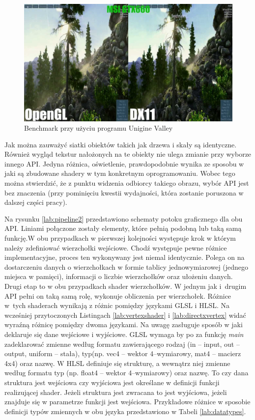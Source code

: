 \documentclass[archive]{mgr}
\begin{document}
\begin{figure}[h!]
  \centering
    \includegraphics[width=1\textwidth]{images/valley.jpg}
   \caption{Benchmark przy użyciu programu Unigine Valley}
   \label{lab:valley}
\end{figure}

Jak można zauważyć siatki obiektów takich jak drzewa i skały są identyczne. Również wygląd tekstur nałożonych na te obiekty nie ulega zmianie przy wyborze innego API. Jedyna różnica, oświetlenie, prawdopodobnie wynika ze sposobu w jaki są zbudowane shadery w tym konkretnym oprogramowaniu. Wobec tego można stwierdzić, że z punktu widzenia odbiorcy takiego obrazu, wybór API jest bez znaczenia (przy pominięciu kwestii wydajności, która zostanie poruszona w dalszej części pracy).

\newpage
Na rysunku \ref{lab:pipeline2} przedstawiono schematy potoku graficznego dla obu API. Liniami połączone zostały elementy, które pełnią podobną lub taką samą funkcję.W obu przypadkach w pierwszej kolejności występuje krok w którym należy zdefiniować wierzchołki wejściowe. Chodź występuje pewne różnice implementacyjne, proces ten wykonywany jest niemal identycznie. Polega on na dostarczeniu danych o wierzchołkach w formie tablicy jednowymiarowej (jednego miejsca w pamięci), informacji o liczbie wierzchołków oraz ułożeniu danych. Drugi etap to w obu przypadkach shader wierzchołków. W jednym jak i~drugim API pełni on taką samą rolę, wykonuje obliczenia per wierzchołek. Różnice w~tych shaderach wynikają z różnic pomiędzy językami GLSL i HLSL. Na wcześniej przytoczonych Listingach \ref{lab:vertexshader} i \ref{lab:directxvertex} widać wyraźną różnicę pomiędzy dwoma językami. Na uwagę zasługuje sposób w jaki deklaruje się dane wejściowe i wyjściowe. GLSL wymaga by po za funkcję \emph{main} zadeklarować zmienne według formatu zawierającego rodzaj (in – input, out – output, uniform – stała), typ(np. vec4 – wektor 4–wymiarowy,  mat4 – macierz 4x4) oraz nazwę. W HLSL definiuje się strukturę, a wewnątrz niej zmienne według formatu typ (np. float4 – wektor 4–wymiarowy) oraz nazwę. To czy dana struktura jest wejściowa czy wyjściowa jest określane w definicji funkcji realizującej shader. Jeżeli struktura jest zwracana to jest wyjściowa, jeżeli znajduje się w parametrze funkcji jest wejściowa. Przykładowe różnice w sposobie definicji typów zmiennych w obu języka przedstawiono w Tabeli \ref{lab:datatypes}.
\end{document}
